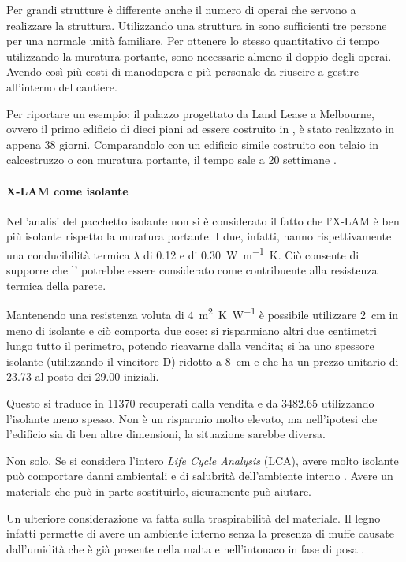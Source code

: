 Per grandi strutture è differente anche il numero di operai che servono a realizzare la struttura. Utilizzando una struttura in \xlam{} sono sufficienti tre persone per una normale unità familiare. Per ottenere lo stesso quantitativo di tempo utilizzando la muratura portante, sono necessarie almeno il doppio degli operai. Avendo così più costi di manodopera e più personale da riuscire a gestire all'interno del cantiere. 

Per riportare un esempio: il palazzo progettato da Land Lease a Melbourne, ovvero il primo edificio di dieci piani ad essere costruito in \xlam, è stato realizzato in appena 38 giorni. Comparandolo con un edificio simile costruito con telaio in calcestruzzo o con muratura portante, il tempo sale a 20 settimane \cite[39]{10storey}. 


\paragraph{X-LAM come isolante}
Nell'analisi del pacchetto isolante non si è considerato il fatto che l'X-LAM è ben più isolante rispetto la muratura portante. I due, infatti, hanno rispettivamente una conducibilità termica $\lambda$ di \SI{0.12}{} e di \SI{0.30}{W\per\metre K}.
Ciò consente di supporre che l'\xlam{} potrebbe essere considerato come contribuente alla resistenza termica della parete. 

Mantenendo una resistenza voluta di \SI{4}{\square\metre K\per W} è possibile utilizzare \SI{2}{\centi\metre} in meno di isolante e ciò comporta due cose: si risparmiano altri due centimetri lungo tutto il perimetro, potendo ricavarne dalla vendita; si ha uno spessore isolante (utilizzando il vincitore D) ridotto a \SI{8}{\centi\metre} e che ha un prezzo unitario di \SI{23.73}{\teuro} al posto dei \SI{29.00}{\teuro} iniziali.

Questo si traduce in \SI{11370}{\teuro} recuperati dalla vendita e da \SI{3482.65}{\teuro} utilizzando l'isolante meno spesso. 
Non è un risparmio molto elevato, ma nell'ipotesi che l'edificio sia di ben altre dimensioni, la situazione sarebbe diversa. 

Non solo. 
Se si considera l'intero \textit{Life Cycle Analysis} (LCA), avere molto isolante può comportare danni ambientali e di salubrità dell'ambiente interno \cite{reijnders_comprehensiveness_1999}. 
Avere un materiale che può in parte sostituirlo, sicuramente può aiutare. 

Un ulteriore considerazione va fatta sulla traspirabilità del materiale. 
Il legno infatti permette di avere un ambiente interno senza la presenza di muffe causate dall'umidità che è già presente nella malta e nell'intonaco in fase di posa \cite{sutton_introduction_nodate}.
